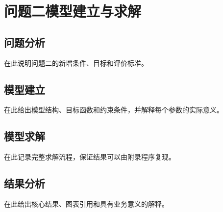 \section{问题二模型建立与求解}

\subsection{问题分析}
在此说明问题二的新增条件、目标和评价标准。

\subsection{模型建立}
在此给出模型结构、目标函数和约束条件，并解释每个参数的实际意义。

\subsection{模型求解}
在此记录完整求解流程，保证结果可以由附录程序复现。

\subsection{结果分析}
在此给出核心结果、图表引用和具有业务意义的解释。

